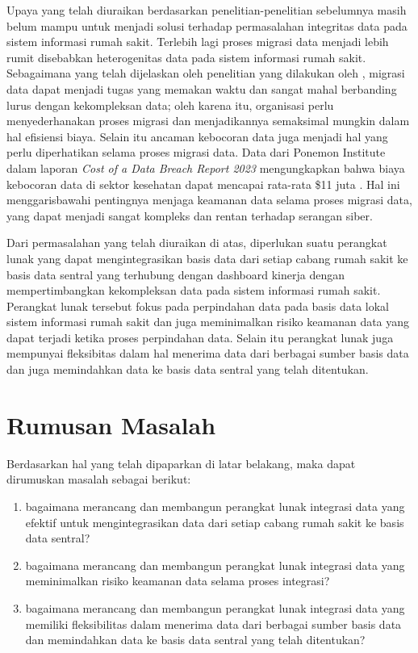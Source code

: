 Upaya yang telah diuraikan berdasarkan penelitian-penelitian sebelumnya masih belum mampu untuk menjadi solusi terhadap permasalahan integritas data pada sistem informasi rumah sakit. Terlebih lagi proses migrasi data menjadi lebih rumit disebabkan heterogenitas data pada sistem informasi rumah sakit. Sebagaimana yang telah dijelaskan oleh penelitian yang dilakukan oleh \textcite{Elamparithi2015}, migrasi data dapat menjadi tugas yang memakan waktu dan sangat mahal berbanding lurus dengan kekompleksan data; oleh karena itu, organisasi perlu menyederhanakan proses migrasi dan menjadikannya semaksimal mungkin dalam hal efisiensi biaya. Selain itu ancaman kebocoran data juga menjadi hal yang perlu diperhatikan selama proses migrasi data. Data dari Ponemon Institute dalam laporan \emph{Cost of a Data Breach Report 2023} mengungkapkan bahwa biaya kebocoran data di sektor kesehatan dapat mencapai rata-rata \$11 juta \parencite{Ponemon2023}. Hal ini menggarisbawahi pentingnya menjaga keamanan data selama proses migrasi data, yang dapat menjadi sangat kompleks dan rentan terhadap serangan siber.


Dari permasalahan yang telah diuraikan di atas, diperlukan suatu perangkat lunak yang dapat mengintegrasikan basis data dari setiap cabang rumah sakit ke basis data sentral
yang terhubung dengan dashboard kinerja dengan mempertimbangkan kekompleksan data pada sistem informasi rumah sakit. Perangkat lunak tersebut fokus pada perpindahan data pada basis data lokal sistem informasi rumah sakit dan juga meminimalkan risiko keamanan data yang dapat terjadi ketika proses perpindahan data. Selain itu perangkat lunak juga mempunyai fleksibitas dalam hal menerima data dari berbagai sumber basis data dan juga memindahkan data ke basis data sentral yang telah ditentukan.

\clearpage

\section{Rumusan Masalah}
Berdasarkan hal yang telah dipaparkan di latar belakang, maka dapat dirumuskan masalah sebagai berikut:
\begin{enumerate}
    \item bagaimana merancang dan membangun perangkat lunak integrasi data yang efektif untuk mengintegrasikan data dari setiap cabang rumah sakit ke basis data sentral?
    \item bagaimana merancang dan membangun perangkat lunak integrasi data yang meminimalkan risiko keamanan data selama proses integrasi?
    \item bagaimana merancang dan membangun perangkat lunak integrasi data yang memiliki fleksibilitas dalam menerima data dari berbagai sumber basis data dan memindahkan data ke basis data sentral yang telah ditentukan?
\end{enumerate}

